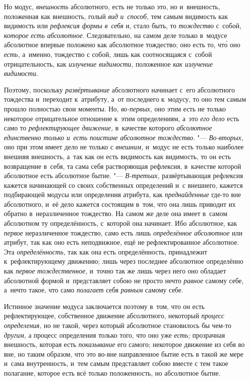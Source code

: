 Но модус, {\em внешность} абсолютного, есть не только
это, но и~внешность, положенная как внешность, голый
{\em вид и~способ,} тем самым видимость как видимость
или {\em рефлексия формы в~себя} и, стало быть, то {\em тождество} с~собой,
{\em которое есть абсолютное}. Следовательно, на самом
деле только в~модусе абсолютное впервые положено как абсолютное тождество;
оно есть то, чт\'{о} оно {\em есть,} а~именно, тождество с
собой, лишь как соотносящаяся с~собой отрицательность, как
{\em излучение видимости,} положенное {\em как излучение видимости}.

Поэтому, поскольку {\em развёртывание} абсолютного
начинает с~его абсолютного тождества и~переходит к~атрибуту, а~от
последнего к~модусу, то оно тем самым прошло полностью свои моменты. Но,
{\em во-первых,} оно этим есть не только некоторое
отрицательное отношение к~этим определениям, а~это {\em его дело} есть само то
{\em рефлектирующее движение,} в~качестве которого
{\em абсолютное единственно только и~есть поистине
абсолютное тождество}. "--- {\em Во-вторых,} оно при этом
имеет дело не только с {\em внешним,} и~модус не есть
только наиболее внешняя внешность, а~так как он есть видимость как
видимость, то он есть возвращение в~себя, та сама себя растворяющая
рефлексия, в~качестве которой абсолютное есть абсолютное бытие. "---
{\em В-третьих,} развёртывающая рефлексия кажется
начинающей со своих собственных определений и~с внешнего, кажется
подбирающей модусы или определения атрибута, как
{\em преднайденные} где-то вне абсолютного, и~её дело
кажется состоящим в~том, что она лишь приводит их обратно в~неразличенное
тождество. На самом же деле она имеет в~самом абсолютном ту определённость,
с~которой она начинает. Ибо абсолютное, как
{\em первое} неразличенное тождество, само есть лишь
{\em определённое абсолютное} или атрибут, так как оно
есть неподвижное, ещё не рефлектированное абсолютное. Эта
{\em определённость,} так как она есть определённость,
принадлежит к~рефлектирующему движению; лишь через последнее абсолютное
определённо как {\em первое тождественное,} и~точно так
же лишь через него оно обладает абсолютной формой и~представляет собою не
просто нечто {\em равное} самому себе, а~нечто такое,
что само {\em полагает} себя
{\em равным} самому себе.

Истинное значение модуса заключается поэтому в~том, что он есть
рефлектирующее, собственное движение абсолютного, некоторый
{\em процесс определения,} но не такой, через который
абсолютное становилось бы чем-то {\em другим,} а
процесс определения только того, что оно уже
{\em есть;} прозрачная внешность, которая есть
{\em показывание} его самого; некоторое движение из
себя во вне, но таким образом, что это во-вне направленное бытие есть в
такой же мере и~сама внутренность, и~тем самым представляет собою вместе с
тем такое полагание, которое есть всё только положенность, но абсолютное бытие.

